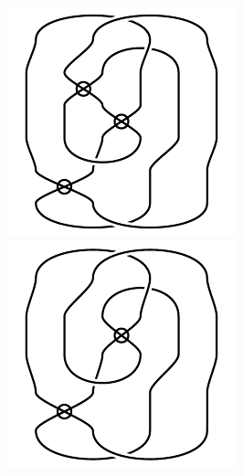 \begin{figure}[H]
\begin{minipage}[b]{.18\linewidth}
\centering
\includegraphics[width=\linewidth]{../data/virtual_4_37.png}
\end{minipage}
\begin{minipage}[b]{.18\linewidth}
\centering
\includegraphics[width=\linewidth]{../data/virtual_4_38.png}

\end{minipage}
\end{figure}
